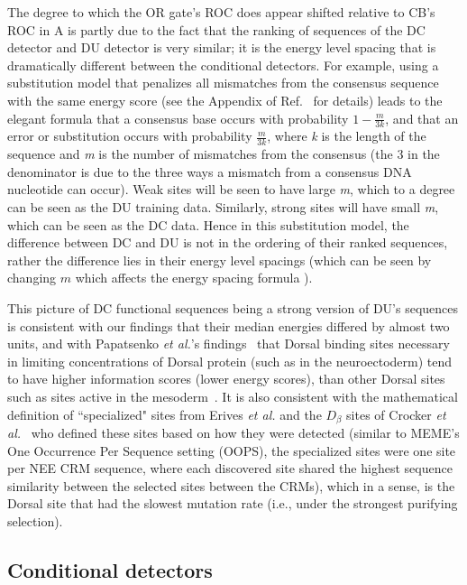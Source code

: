  The degree to which the OR gate's ROC does appear shifted relative to CB's ROC in A is partly due to the fact that the ranking of sequences of the DC detector and DU detector is very similar; it is the energy level spacing that is dramatically different between the conditional detectors.  For example, using a substitution model that penalizes all mismatches from the consensus sequence with the same energy score (see the Appendix of Ref.~\cite{pmid3612791} for details) leads to the elegant formula that a consensus base occurs with probability $1-\frac{m}{3k}$, and that an error or substitution occurs with probability $\frac{m}{3k}$, where \textit{k} is the length of the sequence and \textit{m} is the number of mismatches from the consensus (the 3 in the denominator is due to the three ways a mismatch from a consensus DNA nucleotide can occur).  Weak sites will be seen to have large \textit{m}, which to a degree can be seen as the DU training data. Similarly, strong sites will have small \textit{m}, which can be seen as the DC data.  Hence in this substitution model, the difference between DC and DU is not in the ordering of their ranked sequences, rather the difference lies in their energy level spacings (which can be seen by changing $m$ which affects the energy spacing formula ).  
 
 This picture of DC functional sequences being a strong version of DU's sequences is consistent with our findings that their median energies differed by almost two units, and with Papatsenko \textit{et al.}'s findings~\cite{pmid15795372} that Dorsal binding sites necessary in limiting concentrations of Dorsal protein (such as in the neuroectoderm) tend to have higher information scores (lower energy scores), than other Dorsal sites such as sites active in the mesoderm~\cite{pmid15795372}.  It is also consistent with the mathematical definition of ``specialized" sites from Erives \textit{et al.}\cite{pmid15026577} and the $D_{\beta}$ sites of Crocker \textit{et al.}~\cite{pmid20981027} who defined these sites based on how they were detected (similar to MEME's One Occurrence Per Sequence setting (OOPS)\cite{pmid7584439}, the specialized sites were one site per NEE CRM sequence, where each discovered site shared the highest sequence similarity between the selected sites between the CRMs), which in a sense, is the Dorsal site that had the slowest mutation rate (i.e., under the strongest purifying selection).       
\subsection{Conditional detectors}


